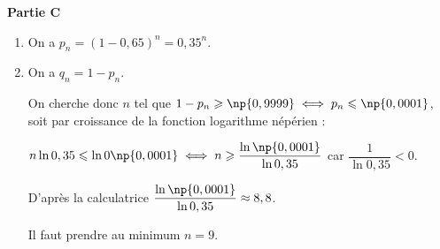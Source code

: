 \textbf{Partie C}

\medskip







\medskip

\begin{enumerate}
\item 
On a $p_n = (1 - 0,65)^n = 0,35^n$.

\item On a $q_n = 1 - p_n$.

On cherche donc $n$ tel que $1 - p_n \geqslant \np{0,9999} \iff p_n \leqslant \np{0,0001}$, soit par croissance de la fonction logarithme népérien :

$n\ln 0,35 \leqslant \ln 0\np{0,0001} \iff n \geqslant \dfrac{\ln \np{0,0001}}{\ln 0,35}$ car $\dfrac{1}{\ln 0,35} < 0$.

D'après la calculatrice $\dfrac{\ln \np{0,0001}}{\ln 0,35} \approx 8,8$.

Il faut prendre au minimum $n = 9$.



\end{enumerate}
